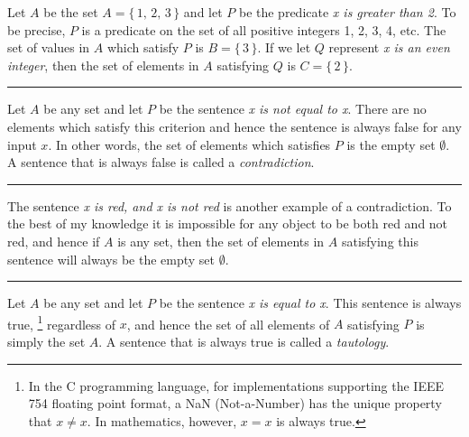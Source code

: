             \begin{example}
                Let $A$ be the set $A=\{\,1,\,2,\,3\,\}$ and let $P$ be the
                predicate \textit{x is greater than 2}. To be precise, $P$ is a
                predicate on the set of all positive integers 1, 2, 3, 4, etc.
                The set of values in $A$ which satisfy $P$ is $B=\{\,3\,\}$. If
                we let $Q$ represent \textit{x is an even integer}, then the
                set of elements in $A$ satisfying $Q$ is $C=\{\,2\,\}$.
            \end{example}
            \hrule
            \begin{example}
                Let $A$ be any set and let $P$ be the sentence
                \textit{x is not equal to x}. There are no elements which
                satisfy this criterion and hence the sentence is always false
                for any input $x$. In other words, the set of elements which
                satisfies $P$ is the empty set $\emptyset$. A sentence that is
                always false is called a
                \textit{contradiction}.
            \end{example}
            \hrule
            \begin{example}
                The sentence \textit{x is red, and x is not red} is another
                example of a contradiction. To the best of my knowledge it is
                impossible for any object to be both red and not red, and hence
                if $A$ is any set, then the set of elements in $A$ satisfying
                this sentence will always be the empty set $\emptyset$.
            \end{example}
            \hrule
            \begin{example}
                Let $A$ be any set and let $P$ be the sentence
                \textit{x is equal to x}. This sentence is always true,%
                \footnote{
                    In the C programming language, for implementations supporting
                    the IEEE 754 floating point format, a NaN (Not-a-Number) has
                    the unique property that $x\ne{x}$. In mathematics, however,
                    $x=x$ is always true.
                }
                regardless
                of $x$, and hence the set of all elements of $A$ satisfying $P$ is
                simply the set $A$. A sentence that is always true is called a
                \textit{tautology}.
            \end{example}
